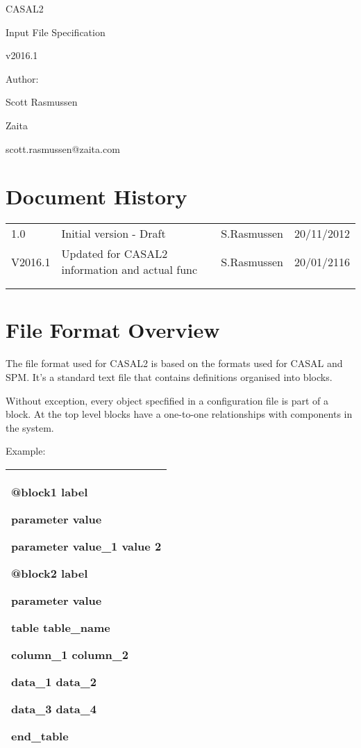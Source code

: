 \documentclass[a4paper,11pt,twoside,pdftex,draft]{article}
\date{}
\begin{document}
CASAL2

Input File Specification

v2016.1

Author:

Scott Rasmussen

Zaita

scott.rasmussen@zaita.com

\hypertarget{document-history}{%
\section[Document
History]{\texorpdfstring{\protect\hypertarget{anchor}{}{}Document
History}{Document History}}\label{document-history}}

\begin{longtable}[]{@{}llll@{}}
\toprule
\endhead
1.0 & Initial version - Draft & S.Rasmussen & 20/11/2012\tabularnewline
V2016.1 & Updated for CASAL2 information and actual func & S.Rasmussen &
20/01/2116\tabularnewline
& & &\tabularnewline
& & &\tabularnewline
\bottomrule
\end{longtable}

\hypertarget{file-format-overview}{%
\section[File Format
Overview]{\texorpdfstring{\protect\hypertarget{anchor-1}{}{}File Format
Overview}{File Format Overview}}\label{file-format-overview}}

The file format used for CASAL2 is based on the formats used for CASAL
and SPM. It's a standard text file that contains definitions organised
into blocks.

Without exception, every object specfified in a configuration file is
part of a block. At the top level blocks have a one-to-one relationships
with components in the system.

Example:

\begin{longtable}[]{@{}l@{}}
\toprule
\endhead
\begin{minipage}[t]{0.97\columnwidth}\raggedright
@block1 label

parameter value

parameter value\_1 value 2

@block2 label

parameter value

table table\_name

column\_1 column\_2

data\_1 data\_2

data\_3 data\_4

end\_table\strut
\end{minipage}\tabularnewline
\bottomrule
\end{longtable}
\end{document}

